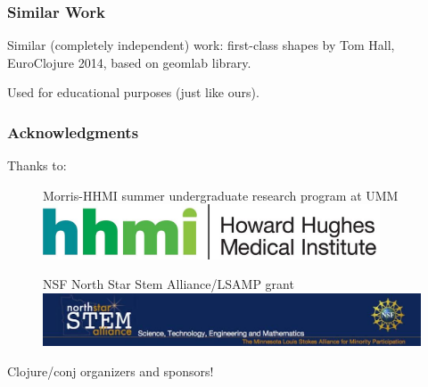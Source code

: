 \documentclass{beamer}
\newcommand{\comment}[1]{{\bf \tt  {#1}}}
\newcommand{\emcomment}[1]{\textcolor{ForestGreen}{\comment{Elena: {#1}}}}
\begin{document}
\begin{frame}
	\frametitle{Similar Work}
Similar (completely independent) work: first-class shapes by Tom Hall, EuroClojure 2014, based on geomlab library. 

Used for educational purposes (just like ours).
\end{frame} 

\begin{frame}
\frametitle{Acknowledgments}
	{\large Thanks to:}
	\begin{figure}
		Morris-HHMI summer undergraduate research program at UMM \includegraphics[width=10cm]{PresentationImages/logoHHMI.jpg}
	\end{figure}
	\begin{figure}
		NSF North Star Stem Alliance/LSAMP grant 
		\includegraphics[width=12cm]{PresentationImages/logoStem.jpg}
	\end{figure}	
	{\centering \qquad Clojure/conj organizers and sponsors!}
\end{frame}
\end{document}
